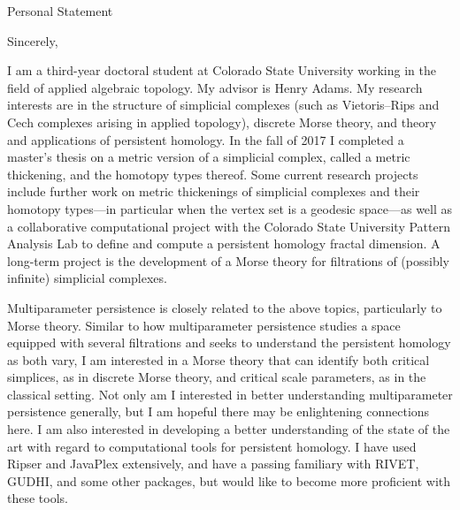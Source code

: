 \documentclass[11pt,letterpaper,sans]{moderncv}        %
\begin{document}
\clearpage
\date{\today}
\opening{Personal Statement}
\closing{Sincerely,}
\makelettertitle
%




I am a third-year doctoral student at Colorado State University working in the field of applied algebraic topology. 
My advisor is Henry Adams.
My research interests are in the structure of simplicial complexes (such as Vietoris--Rips and Cech complexes arising in applied topology), discrete Morse theory, and theory and applications of persistent homology.
In the fall of 2017 I completed a master's thesis on a metric version of a simplicial complex, called a metric thickening, and the homotopy types thereof.
Some current research projects include further work on metric thickenings of simplicial complexes and their homotopy types---in particular when the vertex set is a geodesic space---as well as a collaborative computational project with the Colorado State University Pattern Analysis Lab to define and compute a persistent homology fractal dimension.
A long-term project is the development of a Morse theory for filtrations of (possibly infinite) simplicial complexes.

Multiparameter persistence is closely related to the above topics, particularly to Morse theory.
Similar to how multiparameter persistence studies a space equipped with several filtrations and seeks to understand the persistent homology as both vary, I am interested in a Morse theory that can identify both critical simplices, as in discrete Morse theory, and critical scale parameters, as in the classical setting.
Not only am I interested in better understanding multiparameter persistence generally, but I am hopeful there may be enlightening connections here.
I am also interested in developing a better understanding of the state of the art with regard to computational tools for persistent homology. 
I have used Ripser and JavaPlex extensively, and have a passing familiary with RIVET, GUDHI, and some other packages, but would like to become more proficient with these tools.
\end{document}
